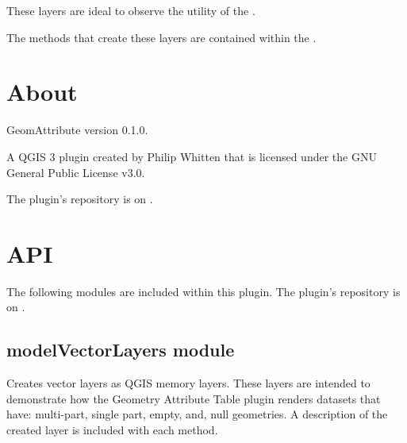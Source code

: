 \documentclass[letterpaper,10pt,english]{sphinxmanual}
\begin{document}
These layers are ideal to observe the utility of the {\hyperref[\detokenize{geomAttribute:geometryattributetable-page}]{}}.

The methods that create these layers are contained within the {\hyperref[\detokenize{API:modelvectorlayers-api}]{}}.


\chapter{About}
\label{\detokenize{about:about}}\label{\detokenize{about::doc}}
GeomAttribute version 0.1.0.

A QGIS 3 plugin created by Philip Whitten that is licensed under the GNU General Public License v3.0.

The plugin’s repository is on .


\chapter{API}
\label{\detokenize{API:api}}\label{\detokenize{API::doc}}
The following modules are included within this plugin.  The plugin’s repository is
on .


\section{modelVectorLayers module}
\label{\detokenize{API:module-modelVectorLayers}}\label{\detokenize{API:modelvectorlayers-module}}\label{\detokenize{API:modelvectorlayers-api}}
Creates vector layers as QGIS memory layers.  These layers are intended to demonstrate how the Geometry Attribute Table
plugin renders datasets that have: multi-part, single part, empty, and, null geometries.  A description of the created
layer is included with each method.
\end{document}
